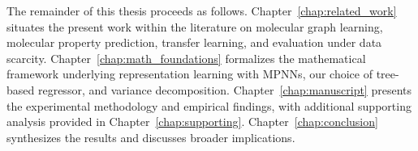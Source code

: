 The remainder of this thesis proceeds as follows. Chapter~\ref{chap:related_work} situates the present work within the literature on molecular graph learning, molecular property prediction, transfer learning, and evaluation under data scarcity. Chapter~\ref{chap:math_foundations} formalizes the mathematical framework underlying representation learning with MPNNs, our choice of tree-based regressor, and variance decomposition. Chapter~\ref{chap:manuscript} presents the experimental methodology and empirical findings, with additional supporting analysis provided in Chapter~\ref{chap:supporting}. Chapter~\ref{chap:conclusion} synthesizes the results and discusses broader implications.
